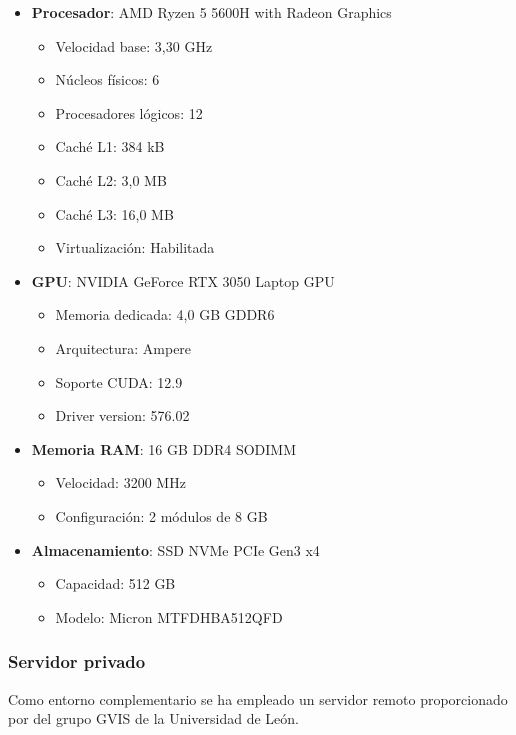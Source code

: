 \documentclass[12pt,a4paper,onecolumn,oneside]{report}
\begin{document}
\begin{itemize}
    \item \textbf{Procesador}: AMD Ryzen 5 5600H with Radeon Graphics
    \begin{itemize}
        \item Velocidad base: 3,30 GHz
        \item Núcleos físicos: 6
        \item Procesadores lógicos: 12
        \item Caché L1: 384 kB
        \item Caché L2: 3,0 MB  
        \item Caché L3: 16,0 MB
        \item Virtualización: Habilitada
    \end{itemize}
    
    \item \textbf{GPU}: NVIDIA GeForce RTX 3050 Laptop GPU
    \begin{itemize}
        \item Memoria dedicada: 4,0 GB GDDR6
        \item Arquitectura: Ampere
        \item Soporte CUDA: 12.9
        \item Driver version: 576.02
    \end{itemize}
    
    \item \textbf{Memoria RAM}: 16 GB DDR4 SODIMM
    \begin{itemize}
        \item Velocidad: 3200 MHz
        \item Configuración: 2 módulos de 8 GB
    \end{itemize}
    
    \item \textbf{Almacenamiento}: SSD NVMe PCIe Gen3 x4
    \begin{itemize}
        \item Capacidad: 512 GB
        \item Modelo: Micron MTFDHBA512QFD
    \end{itemize}
\end{itemize}

\subsubsection{Servidor privado}
Como entorno complementario se ha empleado un servidor remoto proporcionado por del grupo GVIS de la Universidad de León.
\end{document}
